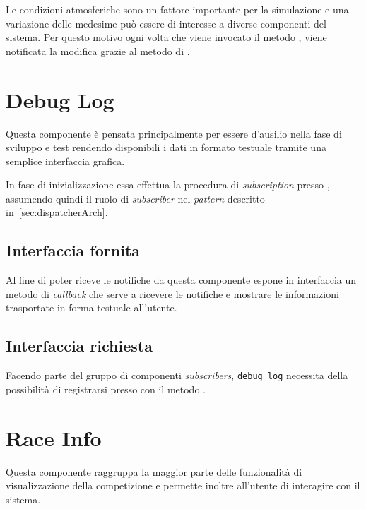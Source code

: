 Le condizioni atmosferiche sono un fattore importante per la simulazione e una variazione delle medesime può essere di interesse a diverse componenti del sistema. Per questo motivo ogni volta che viene invocato il metodo , viene notificata la modifica grazie al metodo  di \evdisp{}.

\section{Debug Log}
Questa componente è pensata principalmente per essere d'ausilio nella fase di sviluppo e test rendendo disponibili i dati in formato testuale tramite una semplice interfaccia grafica.

In fase di inizializzazione essa effettua la procedura di \textit{subscription} presso \evdisp{}, assumendo quindi il ruolo di \textit{subscriber} nel \textit{pattern} descritto in~\ref{sec:dispatcherArch}.

\subsection*{Interfaccia fornita}
Al fine di poter riceve le notifiche da \evdisp{} questa componente espone in interfaccia un metodo di \textit{callback} che serve a ricevere le notifiche e mostrare le informazioni trasportate in forma testuale all'utente.

\subsection*{Interfaccia richiesta}
Facendo parte del gruppo di componenti \textit{subscribers}, \texttt{debug\_log} necessita della possibilità di registrarsi presso \evdisp{} con il metodo .

\section{Race Info}
Questa componente raggruppa la maggior parte delle funzionalità di visualizzazione della competizione e permette inoltre all'utente di interagire con il sistema.

